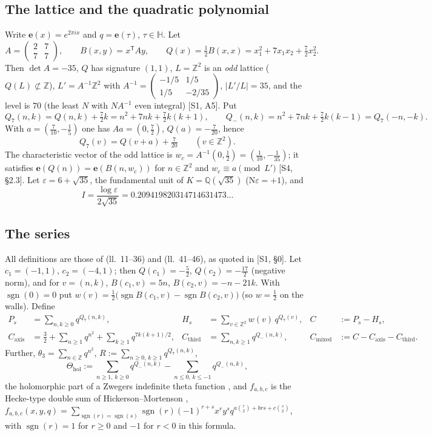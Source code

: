 \documentclass[11pt]{article}
\theoremstyle{definition}
\theoremstyle{plain}
\newcommand{\Q}{\mathbb{Q}}
\newcommand{\Z}{\mathbb{Z}}
\newcommand{\Hb}{\mathbb{H}}
\newcommand{\e}{\mathbf{e}}
\newcommand{\sgn}{\operatorname{sgn}}
\newcommand{\Thol}{\Theta_{\mathrm{hol}}}
\newcommand{\Cthird}{C_{\mathrm{third}}}
\newcommand{\Caxis}{C_{\mathrm{axis}}}
\newcommand{\Cmixed}{C_{\mathrm{mixed}}}
\newcommand{\Nm}{\mathrm{N}}
\newcommand{\src}[1]{\textup{[S#1]}}
\begin{document}
\subsection{The lattice and the quadratic polynomial}
Write $\e(x)=e^{2\pi i x}$ and $q=\e(\tau)$, $\tau\in\Hb$. Let
\[
A=\begin{pmatrix}2&7\\7&7\end{pmatrix},\qquad B(x,y)=x^{\mathsf T}Ay,\qquad
Q(x)=\tfrac12B(x,x)=x_1^2+7x_1x_2+\tfrac72x_2^2 .
\]
Then $\det A=-35$, $Q$ has signature $(1,1)$, $L=\Z^2$ is an \emph{odd} lattice ($Q(L)\not\subset\Z$),
$L'=A^{-1}\Z^2$ with $A^{-1}=\begin{pmatrix}-1/5&1/5\\1/5&-2/35\end{pmatrix}$, $|L'/L|=35$, and the level is
$70$ (the least $N$ with $NA^{-1}$ even integral) \src{1, A5}. Put
\[
Q_7(n,k)=Q(n,k)+\tfrac72k=n^2+7nk+\tfrac72k(k+1),\qquad
Q_-(n,k)=n^2+7nk+\tfrac72k(k-1)=Q_7(-n,-k).
\]
With $a=(\tfrac7{10},-\tfrac15)$ one has $Aa=(0,\tfrac72)$, $Q(a)=-\tfrac7{20}$, hence
\begin{equation}\label{eq:shift}
Q_7(v)=Q(v+a)+\tfrac{7}{20}\qquad(v\in\Z^2).
\end{equation}
The characteristic vector of the odd lattice is $w_c=A^{-1}(0,\tfrac12)=(\tfrac1{10},-\tfrac1{35})$; it satisfies
$\e(Q(n))=\e(B(n,w_c))$ for $n\in\Z^2$ and $w_c\equiv a\pmod{L'}$ \src{4, \S2.3}.
Let $\varepsilon=6+\sqrt{35}$, the fundamental unit of $K=\Q(\sqrt{35})$ ($\Nm\varepsilon=+1$), and
\[
I=\frac{\log\varepsilon}{2\sqrt{35}}=0.209419820314714631473\ldots
\]

\subsection{The series}
All definitions are those of  (ll.~11--36) and
 (ll.~41--46), as quoted in \src{1, \S0}.
Let $c_1=(-1,1)$, $c_2=(-4,1)$; then $Q(c_1)=-\tfrac52$, $Q(c_2)=-\tfrac{17}2$ (negative norm), and for
$v=(n,k)$, $B(c_1,v)=5n$, $B(c_2,v)=-n-21k$. With $\sgn(0)=0$ put
$w(v)=\tfrac12\bigl(\sgn B(c_1,v)-\sgn B(c_2,v)\bigr)$ (so $w=\tfrac12$ on the walls). Define
\begin{align*}
P_s&=\sum_{n,k\ge0}q^{Q_7(n,k)}, &
H_s&=\sum_{v\in\Z^2}w(v)\,q^{Q_7(v)}, &
C&:=P_s-H_s,\\
\Caxis&=\tfrac32+\sum_{n\ge1}q^{n^2}+\sum_{k\ge1}q^{7k(k+1)/2}, &
\Cthird&=\sum_{n,k\ge1}q^{Q_-(n,k)}, &
\Cmixed&:=C-\Caxis-\Cthird.
\end{align*}
Further, $\theta_3=\sum_{n\in\Z}q^{n^2}$, $R:=\sum_{n\ge0,\,k\ge1}q^{Q_7(n,k)}$,
\[
\Thol:=\sum_{n\ge1,\,k\ge0}q^{Q_-(n,k)}-\sum_{n\le0,\,k\le-1}q^{Q_-(n,k)},
\]
the holomorphic part of a Zwegers indefinite theta function \cite{Zw}, and $f_{a,b,c}$ is the
Hecke-type double sum of Hickerson--Mortenson \cite[Def.~0.2]{HM},
$f_{a,b,c}(x,y,q)=\sum_{\sgn(r)=\sgn(s)}\sgn(r)(-1)^{r+s}x^ry^sq^{a\binom r2+brs+c\binom s2}$, with
$\sgn(r)=1$ for $r\ge0$ and $-1$ for $r<0$ in this formula.
\end{document}
